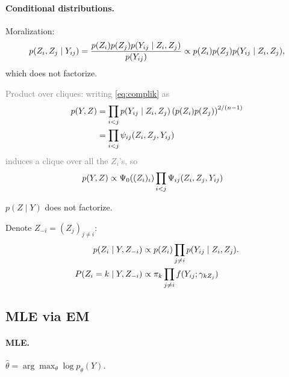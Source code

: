\jump \paragraph{Conditional distributions.}
\begin{itemize}
\item Moralization:
\begin{equation} \label{eq:moralization}
p(Z_i, Z_j \mid {Y_{ij}}) 
= \frac{p(Z_i)p(Z_j)p({Y_{ij}} \mid Z_i, Z_j)}{p({Y_{ij}})}
\propto p(Z_i)p(Z_j)p({Y_{ij}} \mid Z_i, Z_j),
\end{equation}
which does not factorize.
\textcolor{gray}{\item Product over cliques: writing \eqref{eq:complik} as
\begin{align*} 
    p(Y, Z) 
    & = \prod_{i < j} p({Y_{ij}} \mid Z_i, Z_j) \left(p(Z_i) p(Z_j)\right)^{2/(n-1)} \\
    & = \prod_{i < j} \psi_{ij} (Z_i, Z_j, {Y_{ij}})
\end{align*}
induces a clique over all the $Z_i$'s, so 
\begin{align*} 
    p(Y, Z) 
    & \propto \Psi_0((Z_i)_i) \prod_{i < j} \Psi_{ij}(Z_i, Z_j, {Y_{ij}})
\end{align*}}
\ra $p(Z \mid Y)$ does not factorize.
\item Denote $Z_{-i} = (Z_j)_{j \neq i}$:
\begin{align} \label{eq:gibbs}
p(Z_i \mid Y, Z_{-i}) & \propto p(Z_i) \prod_{j \neq i} p({Y_{ij}} \mid Z_i, Z_j). \\
P(Z_i = k \mid Y, Z_{-i}) & \propto \pi_k \prod_{j \neq i} f({Y_{ij}}; \gamma_{kZ_j}) \nonumber
\end{align}
\end{itemize}

\blank
\subsection{MLE via EM}

\jump \paragraph{MLE.}
$\widehat{\theta} = \arg\max_\theta \log p_\theta(Y)$.

